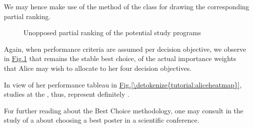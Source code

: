 \documentclass[a4paper,12pt,english]{sphinxhowto}
\let\sphinxpxdimen\pdfpxdimen\else\newdimen\sphinxpxdimen
\begin{document}
We may hence make use of the  method of the  class for drawing the corresponding partial ranking.

\begin{sphinxVerbatim}[commandchars=\\\{\}]
   
\PYGZbs{}
\end{sphinxVerbatim}

\begin{figure}[H]
\centering
\capstart

\noindent\sphinxincludegraphics[width=200\sphinxpxdimen]{{AliceChoice_unopposed}.png}
\caption{Unopposed partial ranking of the potential study programs}\label{\detokenize{tutorial:alicechoice-unopposed}}\end{figure}

Again, when  performance criteria are assumed per decision objective, we observe in \hyperref[\detokenize{tutorial:alicechoice-unopposed}]{Fig.\@ \ref{\detokenize{tutorial:alicechoice-unopposed}}} that  remains the stable best choice,  of the actual importance weights that Alice may wish to allocate to her four decision objectives.

In view of her performance tableau in \hyperref[\detokenize{tutorial:aliceheatmap}]{Fig.\@ \ref{\detokenize{tutorial:aliceheatmap}}},  studies at the , thus, represent definitely .

For further reading about the  Best Choice methodology, one may consult in  the study of a  about choosing a best poster in a scientific conference.
\end{document}
